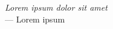 \cleardoublepage
{}
\thispagestyle{empty}

\vspace*{3cm}

\begin{center}
    \textit{Lorem ipsum dolor sit amet} \\ \medskip
    --- Lorem ipsum
\end{center}

\medskip
